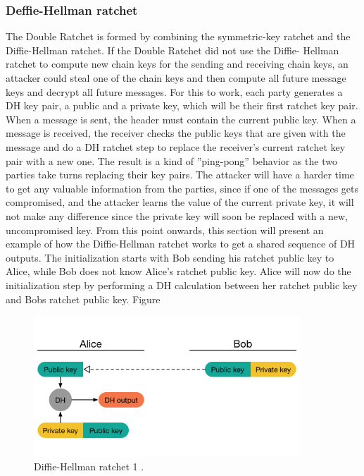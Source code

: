 \subsubsection{Deffie-Hellman ratchet}
The Double Ratchet is formed by combining the symmetric-key ratchet and
the Diffie-Hellman ratchet. If the Double Ratchet did not use the Diffie-
Hellman ratchet to compute new chain keys for the sending and receiving
chain keys, an attacker could steal one of the chain keys and then compute
all future message keys and decrypt all future messages.
For this to work, each party generates a DH key pair, a public and a
private key, which will be their first ratchet key pair. When a message
is sent, the header must contain the current public key. When a message
is received, the receiver checks the public keys that are given with the
message and do a DH ratchet step to replace the receiver’s current ratchet
key pair with a new one.
The result is a kind of ”ping-pong” behavior as the two parties take
turns replacing their key pairs. The attacker will have a harder time to get
any valuable information from the parties, since if one of the messages gets
compromised, and the attacker learns the value of the current private key,
it will not make any difference since the private key will soon be replaced
with a new, uncompromised key.
From this point onwards, this section will present an example of how
the Diffie-Hellman ratchet works to get a shared sequence of DH outputs.
The initialization starts with Bob sending his ratchet public key to Alice,
while Bob does not know Alice’s ratchet public key. Alice will now do
the initialization step by performing a DH calculation between her ratchet
public key and Bobs ratchet public key.
Figure

\begin{figure}[H]
	\centering
	\includegraphics[width=10cm]{figures/dhratchet1.png}
	\caption{Diffie-Hellman ratchet 1 \cite{doubleratchet}.}
	\label{fig:dhratchet1}
\end{figure}


